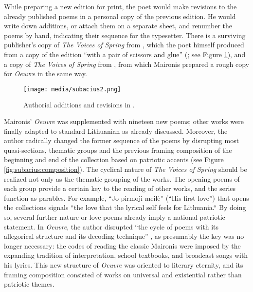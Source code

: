 \begin{paper}
While preparing a new edition for print, the poet would make revisions
to the already published poems in a personal copy of the previous edition. He
would write down additions, or attach them on a separate sheet, and
renumber the poems by hand, indicating their sequence for the
typesetter. There is a surviving publisher's copy of \emph{The Voices of
Spring} from \citeyear{maironis_pavasario_1920}, which the poet himself produced from a copy of the
\citeyear{maironis_pavasario_1913} edition ``with a pair of scissors and glue'' (\citealt{maironis_pavasario_1918}; see
Figure \ref{fig:subacius:maironis1918}), and a copy of \emph{The Voices of Spring} from \citeyear{maironis_pavasario_1920}, from
which Maironis prepared a rough copy for \emph{Oeuvre} \citealt{maironis_pavasario_1926}
in the same way.

\begin{figure}
\texttt{[image: media/subacius2.png]}
\caption{Authorial additions and revisions in \citealt[pages 10--11]{maironis_pavasario_1918}.}
\label{fig:subacius:maironis1918}
\end{figure}

Maironis' \emph{Oeuvre} was supplemented with nineteen new poems; other works were
finally adapted to standard Lithuanian as already discussed. Moreover,
the author radically changed the former sequence of the poems by
disrupting most quasi-sections, thematic groups and the previous
framing composition of the beginning and end of the collection based on
patriotic accents (see Figure \ref{fig:subacius:composition}). The cyclical nature of \emph{The Voices of
Spring} should be realized not only as the thematic grouping of the
works. The opening poems of each group provide a certain key to the
reading of other works, and the series function as parables. For
example, ``Jo pirmoji meilė'' (``His first love'') that opens the
collections signals ``the love that the lyrical self feels for
Lithuania.`` By doing so, several further nature or love poems already
imply a national-patriotic statement. In \emph{Oeuvre}, the author
disrupted ``the cycle of poems with its allegorical structure and its
decoding technique'' \citep[69]{kessler_maironis_2014}, as presumably the key was no
longer necessary: the codes of reading the classic Maironis were
imposed by the expanding tradition of interpretation, school textbooks,
and broadcast songs with his lyrics. This new structure of
\emph{Oeuvre} was oriented to literary eternity, and its framing
composition consisted of works on universal and existential rather than
patriotic themes. 


\end{paper}
